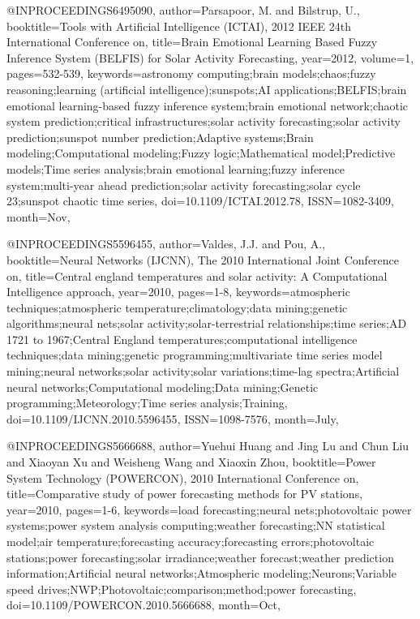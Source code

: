 @INPROCEEDINGS{6495090, 
author={Parsapoor, M. and Bilstrup, U.}, 
booktitle={Tools with Artificial Intelligence (ICTAI), 2012 IEEE 24th International Conference on}, 
title={Brain Emotional Learning Based Fuzzy Inference System (BELFIS) for Solar Activity Forecasting}, 
year={2012}, 
volume={1}, 
pages={532-539}, 
keywords={astronomy computing;brain models;chaos;fuzzy reasoning;learning (artificial intelligence);sunspots;AI applications;BELFIS;brain emotional learning-based fuzzy inference system;brain emotional network;chaotic system prediction;critical infrastructures;solar activity forecasting;solar activity prediction;sunspot number prediction;Adaptive systems;Brain modeling;Computational modeling;Fuzzy logic;Mathematical model;Predictive models;Time series analysis;brain emotional learning;fuzzy inference system;multi-year ahead prediction;solar activity forecasting;solar cycle 23;sunspot chaotic time series}, 
doi={10.1109/ICTAI.2012.78}, 
ISSN={1082-3409}, 
month={Nov},}

@INPROCEEDINGS{5596455, 
author={Valdes, J.J. and Pou, A.}, 
booktitle={Neural Networks (IJCNN), The 2010 International Joint Conference on}, 
title={Central england temperatures and solar activity: A Computational Intelligence approach}, 
year={2010}, 
pages={1-8}, 
keywords={atmospheric techniques;atmospheric temperature;climatology;data mining;genetic algorithms;neural nets;solar activity;solar-terrestrial relationships;time series;AD 1721 to 1967;Central England temperatures;computational intelligence techniques;data mining;genetic programming;multivariate time series model mining;neural networks;solar activity;solar variations;time-lag spectra;Artificial neural networks;Computational modeling;Data mining;Genetic programming;Meteorology;Time series analysis;Training}, 
doi={10.1109/IJCNN.2010.5596455}, 
ISSN={1098-7576}, 
month={July},}

@INPROCEEDINGS{5666688, 
author={Yuehui Huang and Jing Lu and Chun Liu and Xiaoyan Xu and Weisheng Wang and Xiaoxin Zhou}, 
booktitle={Power System Technology (POWERCON), 2010 International Conference on}, 
title={Comparative study of power forecasting methods for PV stations}, 
year={2010}, 
pages={1-6}, 
keywords={load forecasting;neural nets;photovoltaic power systems;power system analysis computing;weather forecasting;NN statistical model;air temperature;forecasting accuracy;forecasting errors;photovoltaic stations;power forecasting;solar irradiance;weather forecast;weather prediction information;Artificial neural networks;Atmospheric modeling;Neurons;Variable speed drives;NWP;Photovoltaic;comparison;method;power forecasting}, 
doi={10.1109/POWERCON.2010.5666688}, 
month={Oct},}

